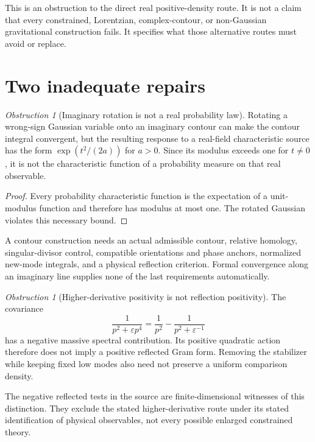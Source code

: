 \documentclass[11pt,a4paper,oneside]{book}
\theoremstyle{plain}
\theoremstyle{definition}
\theoremstyle{remark}
\newtheorem{obstruction}[theorem]{Obstruction}
\begin{document}
This is an obstruction to the direct real positive-density route. It is not a claim that every constrained, Lorentzian, complex-contour, or non-Gaussian gravitational construction fails. It specifies what those alternative routes must avoid or replace.

\section{Two inadequate repairs}
\begin{obstruction}[Imaginary rotation is not a real probability law]
\label{obs:rotation}
Rotating a wrong-sign Gaussian variable onto an imaginary contour can make the contour integral convergent, but the resulting response to a real-field characteristic source has the form $\exp(t^2/(2a))$ for $a>0$. Since its modulus exceeds one for $t\ne0$, it is not the characteristic function of a probability measure on that real observable.
\end{obstruction}
\begin{proof}
Every probability characteristic function is the expectation of a unit-modulus function and therefore has modulus at most one. The rotated Gaussian violates this necessary bound.
\end{proof}
\cite{R9,R10}
A contour construction needs an actual admissible contour, relative homology, singular-divisor control, compatible orientations and phase anchors, normalized new-mode integrals, and a physical reflection criterion. Formal convergence along an imaginary line supplies none of the last requirements automatically.

\begin{obstruction}[Higher-derivative positivity is not reflection positivity]
\label{obs:higher-derivative}
The covariance
\begin{equation}
 \frac1{p^2+\varepsilon p^4}
 =\frac1{p^2}-\frac1{p^2+\varepsilon^{-1}}
 \label{eq:hd-cov}
\end{equation}
has a negative massive spectral contribution. Its positive quadratic action therefore does not imply a positive reflected Gram form. Removing the stabilizer while keeping fixed low modes also need not preserve a uniform comparison density.
\end{obstruction}
\cite{R9,R19}
The negative reflected tests in the source are finite-dimensional witnesses of this distinction. They exclude the stated higher-derivative route under its stated identification of physical observables, not every possible enlarged constrained theory.
\end{document}
